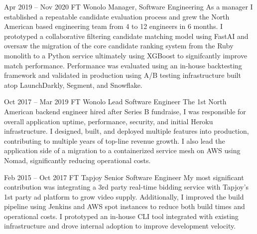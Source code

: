 \documentclass[
	10pt, %
]{FreemanCV}
\begin{document}
\begin{paracol}{2}

\jobentry
	{Apr 2019 -- Nov 2020} %
	{FT} %
	{Wonolo} %
	{Manager, Software Engineering} %
	{As a manager I established a repeatable candidate evaluation process and grew the North American based engineering team from 4 to 12 engineers in 6 months. I prototyped a collaborative filtering candidate matching model using FastAI and oversaw the migration of the core candidate ranking system from the Ruby monolith to a Python service ultimately using XGBoost to signifcantly improve match performance. Performance was evaluated using an in-house backtesting framework and validated in production using A/B testing infrastructure built atop LaunchDarkly, Segment, and Snowflake.} %


\jobentry
	{Oct 2017 -- Mar 2019} %
	{FT} %
	{Wonolo} %
	{Lead Software Engineer} %
	{The 1st North American backend engineer hired after Series B fundraise, I was responsible for overall application uptime, performance, security, and initial Heroku infrastructure. I designed, built, and deployed multiple features into production, contributing to multiple years of top-line revenue growth. I also lead the application side of a migration to a containerized service mesh on AWS using Nomad, significantly reducing operational costs. } %


\jobentry
	{Feb 2015 -- Oct 2017} %
	{FT} %
	{Tapjoy} %
	{Senior Software Engineer} %
	{My most significant contribution was integrating a 3rd party real-time bidding service with Tapjoy's 1st party ad platform to grow video supply. Additionally, I improved the build pipeline using Jenkins and AWS spot instances to reduce both build times and operational costs. I prototyped an in-house CLI tool integrated with existing infrastructure and drove internal adoption to improve development velocity.} %



\switchcolumn %



\end{paracol}
\end{document}
